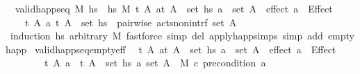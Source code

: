 \begin{isabellebody}
\ \ {\isachardoublequoteopen}{\isasymlbrakk}valid{\isacharunderscore}{\kern0pt}happ{\isacharunderscore}{\kern0pt}seq\ M\ {\isacharparenleft}{\kern0pt}hs{}\ {\isacharat}{\kern0pt}\ hs{}{\isacharparenright}{\kern0pt}\ M{\isacharprime}{\kern0pt}{\isacharsemicolon}{\kern0pt}\ {\isasymAnd}t\ A\ a{\isachardot}{\kern0pt}{\isasymlbrakk}{\isacharparenleft}{\kern0pt}t{\isacharcomma}{\kern0pt}\ A{\isacharparenright}{\kern0pt}\ {\isasymin}\ set\ hs{}{\isacharsemicolon}{\kern0pt}\ a\ {\isasymin}\ set\ A{\isasymrbrakk}\ {\isasymLongrightarrow}\ effect\ a\ {\isacharequal}{\kern0pt}\ Effect\ {\isacharbrackleft}{\kern0pt}{\isacharbrackright}{\kern0pt}\ {\isacharbrackleft}{\kern0pt}{\isacharbrackright}{\kern0pt}{\isasymrbrakk}\ {\isasymLongrightarrow}\isanewline
\ \ \ \ {\isacharparenleft}{\kern0pt}{\isasymAnd}t\ A\ a{\isachardot}{\kern0pt}\ {\isacharparenleft}{\kern0pt}t{\isacharcomma}{\kern0pt}\ A{\isacharparenright}{\kern0pt}\ {\isasymin}\ set\ hs{}\ {\isasymLongrightarrow}\ pairwise\ acts{\isacharunderscore}{\kern0pt}non{\isacharunderscore}{\kern0pt}intrf\ {\isacharparenleft}{\kern0pt}set\ A{\isacharparenright}{\kern0pt}{\isacharparenright}{\kern0pt}{\isachardoublequoteclose}\isanewline
%
\isadelimproof
\ \ %
\endisadelimproof
%
\isatagproof
{}\isamarkupfalse%
\ {\isacharparenleft}{\kern0pt}induction\ hs{}\ arbitrary{\isacharcolon}{\kern0pt}\ M{\isacharparenright}{\kern0pt}\ {\isacharparenleft}{\kern0pt}fastforce\ simp\ del{\isacharcolon}{\kern0pt}\ apply{\isacharunderscore}{\kern0pt}happ{\isachardot}{\kern0pt}simps\ simp\ add{\isacharcolon}{\kern0pt}\ empty{\isacharunderscore}{\kern0pt}happ{\isacharparenright}{\kern0pt}{\isacharplus}{\kern0pt}%
\endisatagproof
{\isafoldproof}%
%
\isadelimproof
\isanewline
%
\endisadelimproof
\isanewline
{}\isamarkupfalse%
\ valid{\isacharunderscore}{\kern0pt}happ{\isacharunderscore}{\kern0pt}seq{\isacharunderscore}{\kern0pt}empty{\isacharunderscore}{\kern0pt}eff{\isacharcolon}{\kern0pt}\isanewline
\ \ {\isachardoublequoteopen}{\isasymlbrakk}{\isasymAnd}t\ A\ a{\isachardot}{\kern0pt}{\isasymlbrakk}{\isacharparenleft}{\kern0pt}t{\isacharcomma}{\kern0pt}\ A{\isacharparenright}{\kern0pt}\ {\isasymin}\ set\ hs{\isacharsemicolon}{\kern0pt}\ a\ {\isasymin}\ set\ A{\isasymrbrakk}\ {\isasymLongrightarrow}\ effect\ a\ {\isacharequal}{\kern0pt}\ Effect\ {\isacharbrackleft}{\kern0pt}{\isacharbrackright}{\kern0pt}\ {\isacharbrackleft}{\kern0pt}{\isacharbrackright}{\kern0pt}{\isacharsemicolon}{\kern0pt}\isanewline
\ \ \ \ \ \ \ \ {\isacharparenleft}{\kern0pt}{\isasymAnd}t\ A\ a{\isachardot}{\kern0pt}\ {\isasymlbrakk}\ {\isacharparenleft}{\kern0pt}t{\isacharcomma}{\kern0pt}\ A{\isacharparenright}{\kern0pt}\ {\isasymin}\ set\ hs{\isacharsemicolon}{\kern0pt}\ a{\isasymin}\ set\ A{\isasymrbrakk}\ {\isasymLongrightarrow}\ M\ \isactrlsup c{\isasymTTurnstile}\isactrlsub {\isacharequal}{\kern0pt}\ precondition\ a{\isacharparenright}{\kern0pt}{\isacharsemicolon}{\kern0pt}\isanewline

\end{isabellebody}

